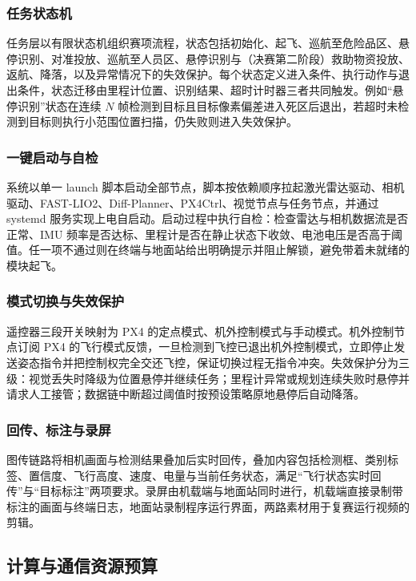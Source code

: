 \subsubsection{任务状态机}

任务层以有限状态机组织赛项流程，状态包括初始化、起飞、巡航至危险品区、悬停识别、对准投放、巡航至人员区、悬停识别与（决赛第二阶段）救助物资投放、返航、降落，以及异常情况下的失效保护。每个状态定义进入条件、执行动作与退出条件，状态迁移由里程计位置、识别结果、超时计时器三者共同触发。例如“悬停识别”状态在连续 $N$ 帧检测到目标且目标像素偏差进入死区后退出，若超时未检测到目标则执行小范围位置扫描，仍失败则进入失效保护。

\subsubsection{一键启动与自检}

系统以单一 launch 脚本启动全部节点，脚本按依赖顺序拉起激光雷达驱动、相机驱动、FAST-LIO2、Diff-Planner、PX4Ctrl、视觉节点与任务节点，并通过 systemd 服务实现上电自启动。启动过程中执行自检：检查雷达与相机数据流是否正常、IMU 频率是否达标、里程计是否在静止状态下收敛、电池电压是否高于阈值。任一项不通过则在终端与地面站给出明确提示并阻止解锁，避免带着未就绪的模块起飞。

\subsubsection{模式切换与失效保护}

遥控器三段开关映射为 PX4 的定点模式、机外控制模式与手动模式。机外控制节点订阅 PX4 的飞行模式反馈，一旦检测到飞控已退出机外控制模式，立即停止发送姿态指令并把控制权完全交还飞控，保证切换过程无指令冲突。失效保护分为三级：视觉丢失时降级为位置悬停并继续任务；里程计异常或规划连续失败时悬停并请求人工接管；数据链中断超过阈值时按预设策略原地悬停后自动降落。

\subsubsection{回传、标注与录屏}

图传链路将相机画面与检测结果叠加后实时回传，叠加内容包括检测框、类别标签、置信度、飞行高度、速度、电量与当前任务状态，满足“飞行状态实时回传”与“目标标注”两项要求。录屏由机载端与地面站同时进行，机载端直接录制带标注的画面与终端日志，地面站录制程序运行界面，两路素材用于复赛运行视频的剪辑。

\subsection{计算与通信资源预算}

